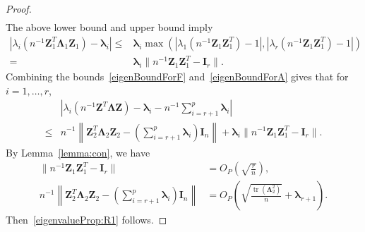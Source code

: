 \documentclass[12pt]{article} %
\DeclareMathOperator{\mytr}{tr}
\newcommand{\bZ}{\mathbf{Z}}
\newcommand{\bI}{\mathbf{I}}
\newcommand{\bfsym}[1]{\ensuremath{\boldsymbol{#1}}}
\def\blambda {\bfsym {\lambda}}
\def\bLambda {\bfsym {\Lambda}}
\theoremstyle{definition}
\begin{document}
\begin{appendices}
\begin{proof}
\begin{equation*}
\begin{aligned}
\end{aligned}
\end{equation*}
The above lower bound and upper bound imply
\begin{equation}\label{eigenBoundForA}
    \begin{aligned}
\left|
\lambda_i(n^{-1}\bZ_1^T \bLambda_1 \bZ_1)-\blambda_i
\right|
\leq&
\blambda_i 
\max\left(
    |\lambda_1(n^{-1}\bZ_1 \bZ_1^T)-1|,
    |\lambda_r(n^{-1}\bZ_1 \bZ_1^T)-1|
\right)
\\
=&\blambda_i \|n^{-1}\bZ_1\bZ_1^T -\bI_r\|.
    \end{aligned}
\end{equation}
Combining the bounds~\eqref{eigenBoundForF} and~\eqref{eigenBoundForA} gives that for $i=1,\ldots,r$,
\begin{equation*}
    \begin{split}
        &
        \left|
        \lambda_i\left(n^{-1}\bZ^T \bLambda \bZ\right)
        -
        \blambda_i
        -
        n^{-1}\sum_{i=r+1}^p\blambda_i
        \right|
        \\
        \leq&
        n^{-1}\left\|\bZ_2^T \bLambda_2 \bZ_2-(\sum_{i=r+1}^p\blambda_i)\bI_n\right\|
        +\blambda_i \|n^{-1}\bZ_1\bZ_1^T -\bI_r\|.
    \end{split}
\end{equation*}
    By Lemma~\ref{lemma:con}, we have
\begin{align}
    \label{conB2B1}
            \|n^{-1}\bZ_1\bZ_1^T -\bI_r\|&=
            O_P\left(\sqrt{\frac{r}{n}}\right),
        \\
        \label{conB2B}
        n^{-1}\left\|\bZ_2^T \bLambda_2 \bZ_2-(\sum_{i=r+1}^p\blambda_i)\bI_n\right\|&=O_P\left(\sqrt{\frac{\mytr(\bLambda_2^2)}{ n}}+\blambda_{r+1}\right).
\end{align}
Then~\eqref{eigenvalueProp:R1} follows.


\end{proof}
\end{appendices}
\end{document}
